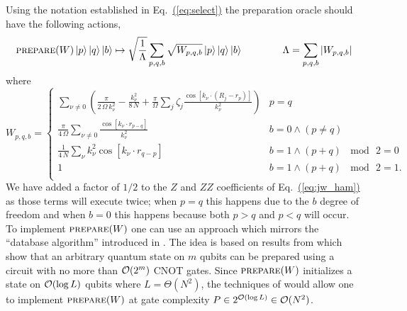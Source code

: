 \documentclass[superscriptaddress,aps,pra,nofootinbib,notitlepage,10pt,longbibliography]{revtex4-1}
\newcommand{\eq}[1]{Eq.~\hyperref[eq:#1]{(\ref*{eq:#1})}}
\def\ket#1{\mathinner{|{#1}\rangle}}
\begin{document}
Using the notation established in \eq{select} the preparation oracle should have the following actions,
\begin{equation}
\label{eq:prepw}
\textsc{prepare}(W) \ket{p}\ket{q}\ket{b} \mapsto \sqrt{\frac{1}{\Lambda}} \sum_{p,q,b} \sqrt{W_{p,q,b}} \ket{p}\ket{q}\ket{b}
\quad \quad \quad \quad \Lambda = \sum_{p,q,b} \left | W_{p,q,b} \right |
\end{equation}
where
\begin{equation}
\label{eq:amps}
W_{p,q,b} = \begin{cases}
\sum_{\nu \neq 0}\left(\frac{\pi}{2 \, \Omega \, k_\nu^2} - \frac{k_\nu^2}{8 \, N} +  \frac{\pi}{\Omega} \sum_{j}\zeta_j\frac{\cos\left[k_\nu \cdot \left(R_j-r_p\right)\right]}{k_\nu^2}  \right) & p = q \\
%
 \frac{\pi}{4\,\Omega } \sum_{\nu \neq 0} \frac{\cos \left[k_\nu \cdot r_{p-q}\right]}{k_\nu^2} & b = 0 \wedge (p \neq q) \\
%
\frac{1}{4\, N} \sum_{\nu} k_\nu^2 \cos \left[k_\nu \cdot r_{q - p} \right]  & b = 1 \wedge (p + q) \, \!\!\mod\!\! \, 2 = 0\\
%
1 & b = 1 \wedge (p + q) \, \!\!\mod\!\! \, 2 = 1.\\
\end{cases}
\end{equation}
We have added a factor of $1 / 2$ to the $Z$ and $ZZ$ coefficients of \eq{jw_ham} as those terms will execute twice; when $p = q$ this happens due to the $b$ degree of freedom and when $b = 0$ this happens because both $p > q$ and $p < q$ will occur. To implement $\textsc{prepare}(W)$ one can use an approach which mirrors the ``database algorithm'' introduced in \cite{BabbushSparse1}. The idea is based on results from \cite{Shende2006} which show that an arbitrary quantum state on $m$ qubits can be prepared using a circuit with no more than ${\cal O}(2^m)$ CNOT gates. Since $\textsc{prepare}(W)$ initializes a state on ${\cal O}(\log L)$ qubits where $L = \Theta(N^2)$, the techniques of \cite{Shende2006} would allow one to implement  $\textsc{prepare}(W)$ at gate complexity $P \in 2^{{\cal O}(\log L)} \in {\cal O}(N^2)$.
\end{document}
